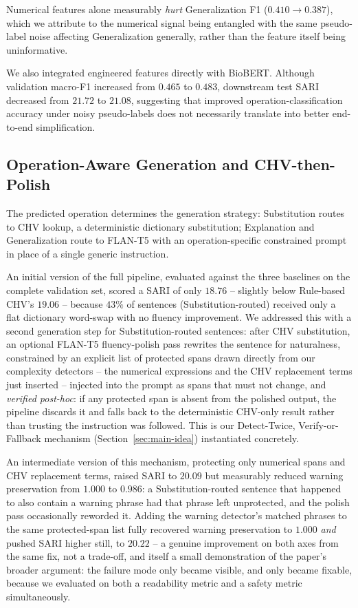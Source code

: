 \documentclass[11pt]{article}
\begin{document}
Numerical features alone measurably \emph{hurt} Generalization F1 ($0.410
\rightarrow 0.387$), which we attribute to the numerical signal being
entangled with the same pseudo-label noise affecting Generalization
generally, rather than the feature itself being uninformative.

We also integrated engineered features directly with BioBERT. Although
validation macro-F1 increased from $0.465$ to $0.483$, downstream test SARI
decreased from $21.72$ to $21.08$, suggesting that improved
operation-classification accuracy under noisy pseudo-labels does not
necessarily translate into better end-to-end simplification.

\subsection{Operation-Aware Generation and CHV-then-Polish}
\label{sec:chv-polish}

The predicted operation determines the generation strategy: Substitution routes
to CHV lookup, a deterministic dictionary substitution; Explanation and
Generalization route to FLAN-T5 with an operation-specific constrained prompt
in place of a single generic instruction.

An initial version of the full pipeline, evaluated against the three baselines
on the complete validation set, scored a SARI of only $18.76$ -- slightly
below Rule-based CHV's $19.06$ -- because $43\%$ of sentences (Substitution-routed)
received only a flat dictionary word-swap with no fluency improvement. We
addressed this with a second generation step for Substitution-routed sentences:
after CHV substitution, an optional FLAN-T5 fluency-polish pass rewrites the
sentence for naturalness, constrained by an explicit list of protected spans
drawn directly from our complexity detectors -- the numerical expressions and
the CHV replacement terms just inserted -- injected into the prompt as spans
that must not change, and \emph{verified post-hoc}: if any protected span is
absent from the polished output, the pipeline discards it and falls back to the
deterministic CHV-only result rather than trusting the instruction was
followed. This is our Detect-Twice, Verify-or-Fallback mechanism
(Section~\ref{sec:main-idea}) instantiated concretely.

An intermediate version of this mechanism, protecting only numerical spans and
CHV replacement terms, raised SARI to $20.09$ but measurably reduced warning
preservation from $1.000$ to $0.986$: a Substitution-routed sentence that
happened to also contain a warning phrase had that phrase left unprotected, and
the polish pass occasionally reworded it. Adding the warning detector's matched
phrases to the same protected-span list fully recovered warning preservation to
$1.000$ \emph{and} pushed SARI higher still, to $20.22$ -- a genuine improvement
on both axes from the same fix, not a trade-off, and itself a small
demonstration of the paper's broader argument: the failure mode only became
visible, and only became fixable, because we evaluated on both a readability
metric and a safety metric simultaneously.
\end{document}

